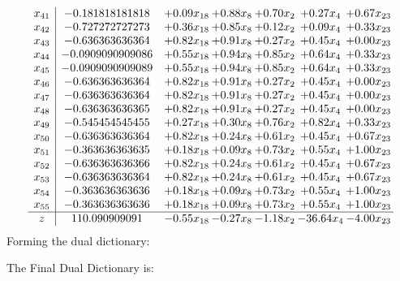 \documentclass[8pt]{article}
\begin{document}
\[\begin{array}{c| c c@{\hskip 2pt} c@{\hskip 2pt} c@{\hskip 2pt} c@{\hskip 2pt} c@{\hskip 2pt} }
 x_{41}   &  -0.181818181818 & +  0.09 x_{18} & +  0.88 x_{8} & +  0.70 x_{2} & +  0.27 x_{4} & +  0.67 x_{23}\\
 x_{42}   &  -0.727272727273 & +  0.36 x_{18} & +  0.85 x_{8} & +  0.12 x_{2} & +  0.09 x_{4} & +  0.33 x_{23}\\
 x_{43}   &  -0.636363636364 & +  0.82 x_{18} & +  0.91 x_{8} & +  0.27 x_{2} & +  0.45 x_{4} & +  0.00 x_{23}\\
 x_{44}   &  -0.0909090909086 & +  0.55 x_{18} & +  0.94 x_{8} & +  0.85 x_{2} & +  0.64 x_{4} & +  0.33 x_{23}\\
 x_{45}   &  -0.0909090909089 & +  0.55 x_{18} & +  0.94 x_{8} & +  0.85 x_{2} & +  0.64 x_{4} & +  0.33 x_{23}\\
 x_{46}   &  -0.636363636364 & +  0.82 x_{18} & +  0.91 x_{8} & +  0.27 x_{2} & +  0.45 x_{4} & +  0.00 x_{23}\\
 x_{47}   &  -0.636363636364 & +  0.82 x_{18} & +  0.91 x_{8} & +  0.27 x_{2} & +  0.45 x_{4} & +  0.00 x_{23}\\
 x_{48}   &  -0.636363636365 & +  0.82 x_{18} & +  0.91 x_{8} & +  0.27 x_{2} & +  0.45 x_{4} & +  0.00 x_{23}\\
 x_{49}   &  -0.545454545455 & +  0.27 x_{18} & +  0.30 x_{8} & +  0.76 x_{2} & +  0.82 x_{4} & +  0.33 x_{23}\\
 x_{50}   &  -0.636363636364 & +  0.82 x_{18} & +  0.24 x_{8} & +  0.61 x_{2} & +  0.45 x_{4} & +  0.67 x_{23}\\
 x_{51}   &  -0.363636363635 & +  0.18 x_{18} & +  0.09 x_{8} & +  0.73 x_{2} & +  0.55 x_{4} & +  1.00 x_{23}\\
 x_{52}   &  -0.636363636366 & +  0.82 x_{18} & +  0.24 x_{8} & +  0.61 x_{2} & +  0.45 x_{4} & +  0.67 x_{23}\\
 x_{53}   &  -0.636363636364 & +  0.82 x_{18} & +  0.24 x_{8} & +  0.61 x_{2} & +  0.45 x_{4} & +  0.67 x_{23}\\
 x_{54}   &  -0.363636363636 & +  0.18 x_{18} & +  0.09 x_{8} & +  0.73 x_{2} & +  0.55 x_{4} & +  1.00 x_{23}\\
 x_{55}   &  -0.363636363636 & +  0.18 x_{18} & +  0.09 x_{8} & +  0.73 x_{2} & +  0.55 x_{4} & +  1.00 x_{23}\\
\hline
z    &  110.090909091 & -0.55 x_{18} & -0.27 x_{8} & -1.18 x_{2} & -36.64 x_{4} & -4.00 x_{23}\\
\end{array}\]
Forming the dual dictionary:

The Final Dual Dictionary is: 
\end{document}
